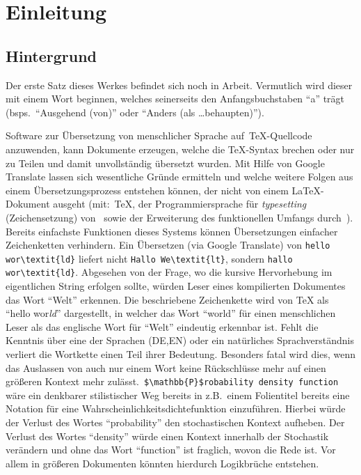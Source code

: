 \section{Einleitung}
\subsection{Hintergrund}\label{einleitung:hintergrund}
Der erste Satz dieses Werkes befindet sich noch in Arbeit. Vermutlich wird dieser mit einem Wort beginnen, welches seinerseits den Anfangsbuchstaben \enquote{a} trägt (bsps.\ \enquote{Ausgehend (von)} oder \enquote{Anders (als \ldots behaupten)}).%

Software zur Übersetzung von menschlicher Sprache auf~\nocite{texbook}\TeX{}-Quellcode anzuwenden, kann Dokumente erzeugen, welche die \TeX{}-Syntax brechen oder nur zu Teilen und damit unvollständig übersetzt wurden. Mit Hilfe von Google Translate lassen sich wesentliche Gründe ermitteln und welche weitere Folgen aus einem Übersetzungsprozess entstehen können, der nicht von einem \LaTeX{}-Dokument ausgeht (mit:\ \TeX{}, der Programmiersprache für \textit{typesetting} (Zeichensetzung) von~\cite{texbook} sowie der Erweiterung des funktionellen Umfangs durch~\cite{latexCompanion:leslieLamport}).%
Bereits einfachste Funktionen dieses Systems können Übersetzungen einfacher Zeichenketten verhindern. Ein Übersetzen (via Google Translate) von \verb|hello wor\textit{ld}| liefert nicht \verb|Hallo We\textit{lt}|, sondern \verb|hallo wor\textit{ld}|. Abgesehen von der Frage, wo die kursive Hervorhebung im eigentlichen String erfolgen sollte, würden Leser eines kompilierten Dokumentes das Wort \enquote{Welt} erkennen.%
Die beschriebene Zeichenkette wird von \TeX{} als \enquote{hello wor\textit{ld}} dargestellt, in welcher das Wort \enquote{world} für einen menschlichen Leser als das englische Wort für \enquote{Welt} eindeutig erkennbar ist. Fehlt die Kenntnis über eine der Sprachen (DE,EN) oder ein natürliches Sprachverständnis verliert die Wortkette einen Teil ihrer Bedeutung.%
Besonders fatal wird dies, wenn das Auslassen von auch nur einem Wort keine Rückschlüsse mehr auf einen größeren Kontext mehr zulässt.\ \verb|$\mathbb{P}$robability density function| wäre ein denkbarer stilistischer Weg bereits in z.B.\ einem Folientitel bereits eine Notation für eine Wahrscheinlichkeitsdichtefunktion einzuführen. Hierbei würde der Verlust des Wortes \enquote{probability} den stochastischen Kontext aufheben. Der Verlust des Wortes \enquote{density} würde einen Kontext innerhalb der Stochastik verändern und ohne das Wort \enquote{function} ist fraglich, wovon die Rede ist. Vor allem in größeren Dokumenten könnten hierdurch Logikbrüche entstehen.%
\\\noindent

